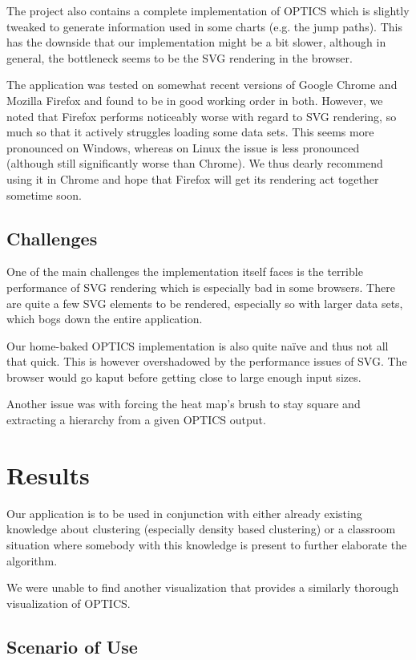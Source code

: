 \documentclass{vgtc} %
\begin{document}
The project also contains a complete implementation of OPTICS which is slightly tweaked to
generate information used in some charts (e.g. the jump paths). This has the downside
that our implementation might be a bit slower, although in general, the bottleneck seems
to be the SVG rendering in the browser.

The application was tested on somewhat recent versions of Google Chrome and Mozilla Firefox
and found to be in good working order in both. However, we noted that Firefox performs noticeably
worse with regard to SVG rendering, so much so that it actively struggles loading
some data sets. This seems more pronounced on Windows, whereas on Linux the issue is less pronounced
(although still significantly worse than Chrome). We thus dearly recommend using it in
Chrome and hope that Firefox will get its rendering act together sometime soon.

\subsection{Challenges}

One of the main challenges the implementation itself faces is the terrible performance
of SVG rendering which is especially bad in some browsers. There are quite a few SVG
elements to be rendered, especially so with larger data sets, which bogs down the entire
application.

Our home-baked OPTICS implementation is also quite na\"ive and thus not all
that quick. This is however overshadowed by the performance issues of SVG. The
browser would go kaput before getting close to large enough input sizes.

Another issue was with forcing the heat map's brush to stay square and extracting a
hierarchy from a given OPTICS output.

\section{Results}

Our application is to be used in conjunction with either already existing
knowledge about clustering (especially density based clustering) or a classroom
situation where somebody with this knowledge is present to further elaborate
the algorithm.

We were unable to find another visualization that provides a similarly thorough
visualization of OPTICS.

\subsection{Scenario of Use}
\end{document}
